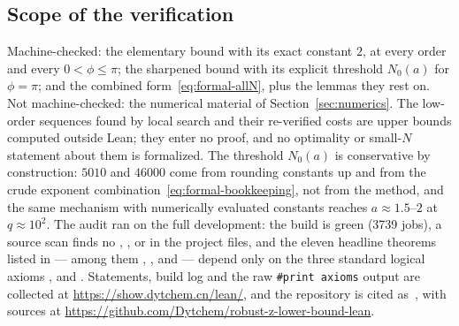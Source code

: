 \subsection{Scope of the verification}

Machine-checked: the elementary bound with its exact constant $2$, at every order and every
$0<\phi\le\pi$; the sharpened bound with its explicit threshold $N_0(a)$ for $\phi=\pi$; and the
combined form~\eqref{eq:formal-allN}, plus the lemmas they rest on. Not machine-checked:
the numerical material of Section~\ref{sec:numerics}. The low-order sequences found by local
search and their re-verified costs are upper bounds computed outside Lean; they enter no proof,
and no optimality or small-$N$ statement about them is formalized. The threshold $N_0(a)$ is
conservative by construction: $5010$ and $46000$ come from rounding constants up and from the
crude exponent combination~\eqref{eq:formal-bookkeeping}, not from the method, and the same
mechanism with numerically evaluated constants reaches $a\approx1.5$--$2$ at $q\approx10^{2}$.
The audit ran on the full development: the build is green (3739 jobs), a source scan finds no
, , or  in the project files, and the eleven headline
theorems listed in  --- among them ,
,  and 
--- depend only on the three standard logical axioms , 
and . Statements, build log and the raw \texttt{\#print axioms} output are
collected at \url{https://show.dytchem.cn/lean/}, and the repository is cited as~\cite{LeanRepo},
with sources at \url{https://github.com/Dytchem/robust-z-lower-bound-lean}.
